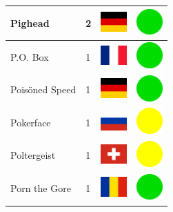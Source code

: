 \documentclass[12pt, a4paper, twoside]{report}
\begin{document}
\begin{center}
\begin{longtable}{|p{5cm}|p{2cm}|p{2cm}|p{2cm}|}
			Pighead & 2 & \includegraphics[width=1cm]{4x3/de} & \includegraphics[width=1cm]{likes/y} \\ \hline
			P.O. Box & 1 & \includegraphics[width=1cm]{4x3/fr} & \includegraphics[width=1cm]{likes/y} \\ \hline
			Poisöned Speed & 1 & \includegraphics[width=1cm]{4x3/de} & \includegraphics[width=1cm]{likes/y} \\ \hline
			Pokerface & 1 & \includegraphics[width=1cm]{4x3/ru} & \includegraphics[width=1cm]{likes/m} \\ \hline
			Poltergeist & 1 & \includegraphics[width=1cm]{4x3/ch} & \includegraphics[width=1cm]{likes/m} \\ \hline
			Porn the Gore & 1 & \includegraphics[width=1cm]{4x3/ro} & \includegraphics[width=1cm]{likes/y} \\ \hline

\end{longtable}
\end{center}
\end{document}
